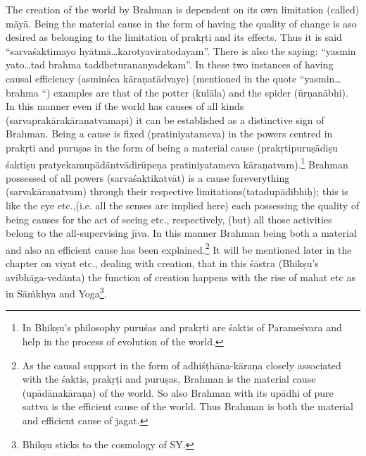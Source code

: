 The creation of the world by Brahman is dependent on its own limitation (called) māyā. Being the material cause in the form of having the quality of change is aso desired as belonging to the limitation of prakṛti and its effects. Thus it is said “sarvaśaktimayo hyātmā…karotyavirato\-dayam”. There is also the saying: “yasmin yato…tad brahma taddheturananyadekam”. In these two instances of having causal efficiency (asminśca kāraṇatādvaye) (mentioned in the quote “yasmin…brahma “) examples are that of the potter (kulāla) and the spider (ūrṇanābhi). In this manner even if the world has causes of all kinds (sarvaprakārakāra\-ṇatvamapi) it can be established as a distinctive sign of Brahman. Being a cause is fixed (pratiniyatameva) in the powers centred in prakṛti and puruṣas in the form of being a material cause (prakṛtipuruṣādiṣu śaktiṣu pratyekamupādāntvādirūpeṇa pratiniyatameva kāraṇatvam).\footnote{In Bhikṣu’s philosophy puruśas and prakṛti are śaktis of Parameśvara and help in the process of evolution of the world.} Brahman possessed of all powers (sarvaśaktikatvāt) is a cause for\break everything (sarvakāraṇatvam) through their respective limitations\break (tatadupādibhiḥ);  this is like the eye etc.,(i.e. all the senses are implied here) each possessing the quality of being causes for the act of seeing etc., respectively, (but) all those activities belong to the all-supervising jīva. In this manner Brahman being both a material and also an efficient cause has been explained.\footnote{As the causal support in the form of adhiśṭhāna-kāraṇa closely associated with the śaktis, prakṛṭi and puruṣas, Brahman is the material cause (upādānakāraṇa) of the world. So also Brahman with its upādhi of pure sattva is the efficient cause of the world. Thus Brahman is both the material and efficient cause of jagat.}  It will be mentioned later in the chapter on viyat etc., dealing with creation, that in this śāstra (Bhikṣu’s avibhāga-vedānta) the function of creation happens with the rise of mahat etc as in Sāṁkhya and Yoga\footnote{Bhikṣu sticks to the cosmology of SY.}. 

